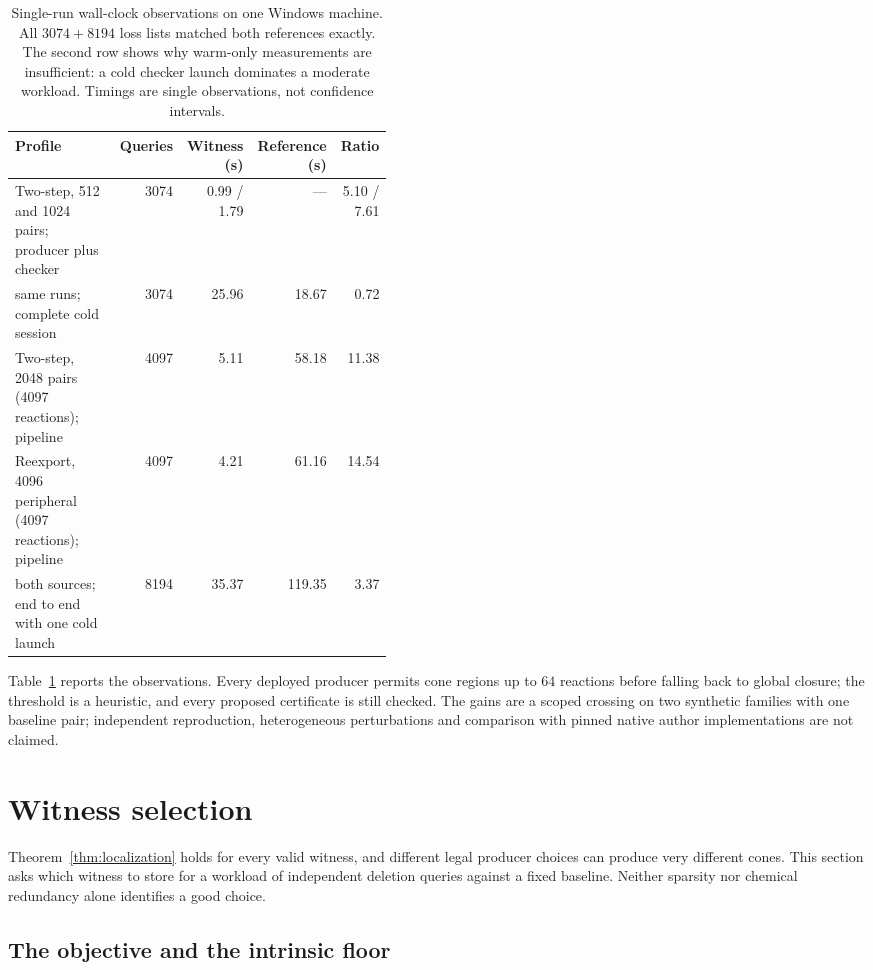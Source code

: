 \documentclass[11pt,a4paper]{article}
\theoremstyle{plain}
\theoremstyle{definition}
\theoremstyle{remark}
\begin{document}
\begin{table}[t]
\centering\small
\begin{tabular}{@{}p{0.44\linewidth}rrrr@{}}
\toprule
Profile & Queries & Witness (s) & Reference (s) & Ratio \\
\midrule
Two-step, 512 and 1024 pairs; producer plus checker & 3074 & 0.99 / 1.79 & --- & 5.10 / 7.61 \\
\quad same runs; complete cold session & 3074 & 25.96 & 18.67 & 0.72 \\
Two-step, 2048 pairs (4097 reactions); pipeline & 4097 & 5.11 & 58.18 & 11.38 \\
Reexport, 4096 peripheral (4097 reactions); pipeline & 4097 & 4.21 & 61.16 & 14.54 \\
\quad both sources; end to end with one cold launch & 8194 & 35.37 & 119.35 & 3.37 \\
\bottomrule
\end{tabular}
\caption{Single-run wall-clock observations on one Windows machine. All $3074+8194$ loss lists matched both references exactly. The second row shows why warm-only measurements are insufficient: a cold checker launch dominates a moderate workload. Timings are single observations, not confidence intervals.}
\label{tab:qc}
\end{table}

Table~\ref{tab:qc} reports the observations. Every deployed producer permits cone regions up to $64$ reactions before falling back to global closure; the threshold is a heuristic, and every proposed certificate is still checked. The gains are a scoped crossing on two synthetic families with one baseline pair; independent reproduction, heterogeneous perturbations and comparison with pinned native author implementations are not claimed.

\section{Witness selection}\label{sec:selection}

Theorem~\ref{thm:localization} holds for every valid witness, and different legal producer choices can produce very different cones. This section asks which witness to store for a workload of independent deletion queries against a fixed baseline. Neither sparsity nor chemical redundancy alone identifies a good choice.

\subsection{The objective and the intrinsic floor}
\end{document}
